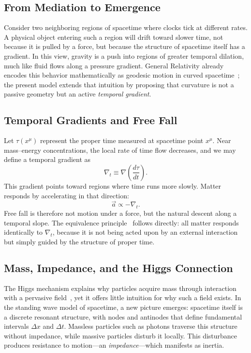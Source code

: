\documentclass[12pt]{article}
\begin{document}
\subsection{From Mediation to Emergence}

Consider two neighboring regions of spacetime where clocks tick at different rates. A physical object entering such a region will drift toward slower time, not because it is pulled by a force, but because the structure of spacetime itself has a gradient. In this view, gravity is a push into regions of greater temporal dilation, much like fluid flows along a pressure gradient. General Relativity already encodes this behavior mathematically as geodesic motion in curved spacetime~\cite{Einstein1916,MTW1973}; the present model extends that intuition by proposing that curvature is not a passive geometry but an active \emph{temporal gradient}.

\subsection{Temporal Gradients and Free Fall}

Let $\tau(x^\mu)$ represent the proper time measured at spacetime point $x^\mu$. Near mass–energy concentrations, the local rate of time flow decreases, and we may define a temporal gradient as
\[
\nabla_t \equiv \nabla \left( \frac{d\tau}{dt} \right).
\]
This gradient points toward regions where time runs more slowly. Matter responds by accelerating in that direction:
\[
\vec{a} \propto -\nabla_t.
\]
Free fall is therefore not motion under a force, but the natural descent along a temporal slope. The equivalence principle~\cite{Einstein1907,Will2014} follows directly: all matter responds identically to $\nabla_t$, because it is not being acted upon by an external interaction but simply guided by the structure of proper time.

\subsection{Mass, Impedance, and the Higgs Connection}
\label{sec:higgs-impedance}

The Higgs mechanism explains why particles acquire mass through interaction with a pervasive field~\cite{Higgs1964,Englert1964}, yet it offers little intuition for why such a field exists. In the standing wave model of spacetime, a new picture emerges: spacetime itself is a discrete resonant structure, with nodes and antinodes that define fundamental intervals $\Delta x$ and $\Delta t$. Massless particles such as photons traverse this structure without impedance, while massive particles disturb it locally. This disturbance produces resistance to motion---an \emph{impedance}---which manifests as inertia.
\end{document}
